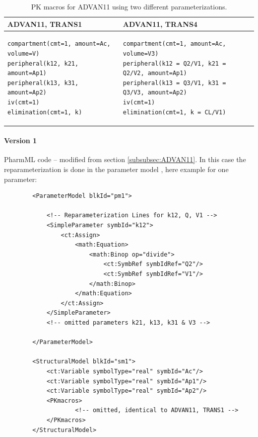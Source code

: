 \begin{table}[ht]
\begin{center}
\begin{tabular*}{.95\textwidth}{@{\extracolsep{\fill} } ll}
  \hline
  \hline
ADVAN11, TRANS1 & ADVAN11, TRANS4 \\
  \hline

\lstset{language=NONMEMdataSet}
\begin{lstlisting}
compartment(cmt=1, amount=Ac, volume=V)
peripheral(k12, k21, amount=Ap1)
peripheral(k13, k31, amount=Ap2)
iv(cmt=1)
elimination(cmt=1, k)
\end{lstlisting}
&
\lstset{language=NONMEMdataSet}
\begin{lstlisting}
compartment(cmt=1, amount=Ac, volume=V3)
peripheral(k12 = Q2/V1, k21 = Q2/V2, amount=Ap1)
peripheral(k13 = Q3/V1, k31 = Q3/V3, amount=Ap2)
iv(cmt=1)
elimination(cmt=1, k = CL/V1)
\end{lstlisting}

\end{tabular*}
\caption{PK macros for ADVAN11 using two different parameterizations.}
\end{center}
\end{table}

\paragraph{Version 1}
PharmML code -- modified from section \ref{subsubsec:ADVAN11}. In this case the 
reparameterization is done in the parameter model , here example for one 
parameter:
\lstset{language=XML}
\begin{lstlisting}
        <ParameterModel blkId="pm1">
            
            <!-- Reparameterization Lines for k12, Q, V1 -->
            <SimpleParameter symbId="k12">
                <ct:Assign>
                    <math:Equation>
                        <math:Binop op="divide">
                            <ct:SymbRef symbIdRef="Q2"/>
                            <ct:SymbRef symbIdRef="V1"/>
                        </math:Binop>
                    </math:Equation>
                </ct:Assign>
            </SimpleParameter>
            <!-- omitted parameters k21, k13, k31 & V3 -->
            
        </ParameterModel>

        <StructuralModel blkId="sm1">
            <ct:Variable symbolType="real" symbId="Ac"/>
            <ct:Variable symbolType="real" symbId="Ap1"/>
            <ct:Variable symbolType="real" symbId="Ap2"/>
            <PKmacros>
                    <!-- omitted, identical to ADVAN11, TRANS1 -->
            </PKmacros>
        </StructuralModel>
\end{lstlisting}

